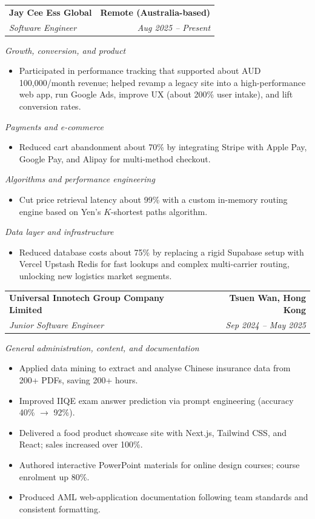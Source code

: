 \documentclass[10pt,a4paper]{article}
\makeatletter
\newcommand{\resumeSubheading}[4]{%
  \vspace{0.6em}%
  \begin{tabular*}{\textwidth}{l@{\extracolsep{\fill}}r}
    \textbf{#1} & \textbf{#2} \\
    \textit{\small #3} & \textit{\small #4} \\
  \end{tabular*}\vspace{0.32em}}
\makeatother
\begin{document}
\resumeSubheading{Jay Cee Ess Global}{Remote (Australia-based)}{Software Engineer}{Aug 2025 -- Present}

\noindent\textit{Growth, conversion, and product}
\begin{itemize}
  \item Participated in performance tracking that supported about AUD\,100{,}000/month revenue; helped revamp a legacy site into a high-performance web app, run Google Ads, improve UX (about 200\% user intake), and lift conversion rates.
\end{itemize}

\noindent\textit{Payments and e-commerce}
\begin{itemize}
  \item Reduced cart abandonment about 70\% by integrating Stripe with Apple Pay, Google Pay, and Alipay for multi-method checkout.
\end{itemize}

\noindent\textit{Algorithms and performance engineering}
\begin{itemize}
  \item Cut price retrieval latency about 99\% with a custom in-memory routing engine based on Yen's $K$-shortest paths algorithm.
\end{itemize}

\noindent\textit{Data layer and infrastructure}
\begin{itemize}
  \item Reduced database costs about 75\% by replacing a rigid Supabase setup with Vercel Upstash Redis for fast lookups and complex multi-carrier routing, unlocking new logistics market segments.
\end{itemize}

\resumeSubheading{Universal Innotech Group Company Limited}{Tsuen Wan, Hong Kong}{Junior Software Engineer}{Sep 2024 -- May 2025}

\noindent\textit{General administration, content, and documentation}
\begin{itemize}
  \item Applied data mining to extract and analyse Chinese insurance data from 200+ PDFs, saving 200+ hours.
  \item Improved IIQE exam answer prediction via prompt engineering (accuracy 40\% $\rightarrow$ 92\%).
  \item Delivered a food product showcase site with Next.js, Tailwind CSS, and React; sales increased over 100\%.
  \item Authored interactive PowerPoint materials for online design courses; course enrolment up 80\%.
  \item Produced AML web-application documentation following team standards and consistent formatting.
\end{itemize}
\end{document}
